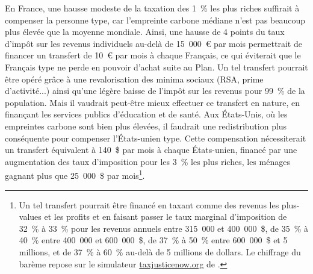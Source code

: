 \documentclass[a5paper,french,openany]{memoir}
\begin{document}
En France, une hausse modeste de la taxation des 1~\% les plus riches suffirait à compenser la personne type, car l'empreinte carbone médiane n'est pas beaucoup plus élevée que la moyenne mondiale. Ainsi, une hausse de 4 points du taux d'impôt sur les revenus individuels au-delà de 15~000~\euro{} par mois permettrait de financer un transfert de 10~\euro{} par mois à chaque Français, ce qui éviterait que le Français type ne perde en pouvoir d'achat suite au Plan. Un tel transfert pourrait être opéré grâce à une revalorisation des minima sociaux (RSA, prime d'activité...) ainsi qu'une légère baisse de l'impôt sur les revenus pour 99~\% de la population. Mais il vaudrait peut-être mieux effectuer ce transfert en nature, en finançant les services publics d'éducation et de santé. Aux États-Unis, où les empreintes carbone sont bien plus élevées, il faudrait une redistribution plus conséquente pour compenser l'États-unien type. Cette compensation nécessiterait un transfert équivalent à 140~\$ par mois à chaque États-unien, financé par une augmentation des taux d'imposition pour les 3~\% les plus riches, les ménages gagnant plus que 25~000~\$ par mois\footnote{Un tel transfert pourrait être financé en taxant comme des revenus les plus-values et les profits et en faisant passer le taux marginal d'imposition de 32~\% à 33~\% pour les revenus annuels entre 315~000 et 400~000~\$, de 35~\% à 40~\% entre 400~000 et 600~000~\$, de 37~\% à 50~\% entre 600~000~\$ et 5 millions, et de 37~\% à 60~\% au-delà de 5 millions de dollars. Le chiffrage du barème repose sur le simulateur \href{https://taxjusticenow.org/}{taxjusticenow.org} de \cite{saez_triumph_2019}.}.%

\end{document}
